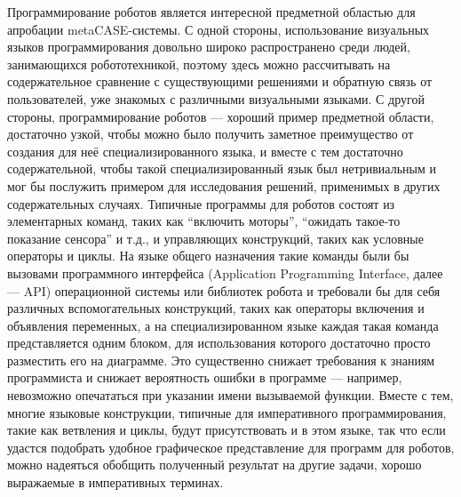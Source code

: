 \documentclass[a4paper]{article}
\begin{document}
Программирование роботов является интересной предметной областью для апробации metaCASE-системы. С одной стороны, использование визуальных языков программирования довольно широко распространено среди людей, занимающихся робототехникой, поэтому здесь можно рассчитывать на содержательное сравнение с существующими решениями и обратную связь от пользователей, уже знакомых с различными визуальными языками. С другой стороны, программирование роботов --- хороший пример предметной области, достаточно узкой, чтобы можно было получить заметное преимущество от создания для неё специализированного языка, и вместе с тем достаточно содержательной, чтобы такой специализированный язык был нетривиальным и мог бы послужить примером для исследования решений, применимых в других содержательных случаях. Типичные программы для роботов состоят из элементарных команд, таких как ``включить моторы'', ``ожидать такое-то показание сенсора'' и т.д., и управляющих конструкций, таких как условные операторы и циклы. На языке общего назначения такие команды были бы вызовами программного интерфейса (Application Programming Interface, далее --- API) операционной системы или библиотек робота и требовали бы для себя различных вспомогательных конструкций, таких как операторы включения и объявления переменных, а на специализированном языке каждая такая команда представляется одним блоком, для использования которого достаточно просто разместить его на диаграмме. Это существенно снижает требования к знаниям программиста и снижает вероятность ошибки в программе --- например, невозможно опечататься при указании имени вызываемой функции. Вместе с тем, многие языковые конструкции, типичные для императивного программирования, такие как ветвления и циклы, будут присутствовать и в этом языке, так что если удастся подобрать удобное графическое представление для программ для роботов, можно надеяться обобщить полученный результат на другие задачи, хорошо выражаемые в императивных терминах.
\end{document}
